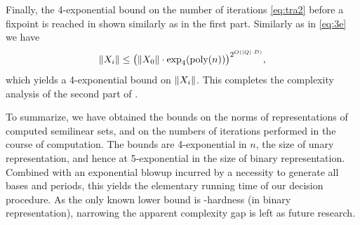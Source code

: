 Finally, the 4-exponential bound on the number of iterations 
\eqref{eq:tra2} before a fixpoint is reached in shown similarly
as in the first part.
Similarly as in \eqref{eq:3e} we have
\[
\lVert X_i\rVert \leq \bigl(\lVert X_0\rVert \cdot 
\exp_{4}(\text{poly}(n))\bigr)^{2^{O(|Q| \cdot D)}},
\]
which yields a 4-exponential bound on $\lVert X_i\rVert$.
This completes the complexity analysis of the second part of 
.

\medskip


\medskip

To summarize, we have obtained the bounds on the norms of 
representations of computed semilinear sets, and on the numbers
of iterations performed in the course of computation.
The bounds are 4-exponential in $n$, the size of unary representation,
and hence at 5-exponential in the size of binary representation.
Combined with an exponential blowup incurred by a necessity to generate
all bases and periods, this yields
the elementary running time of our decision procedure.
% 
As the only known lower bound is \pspace-hardness
(in binary representation),
narrowing the apparent complexity gap is left as future research.
